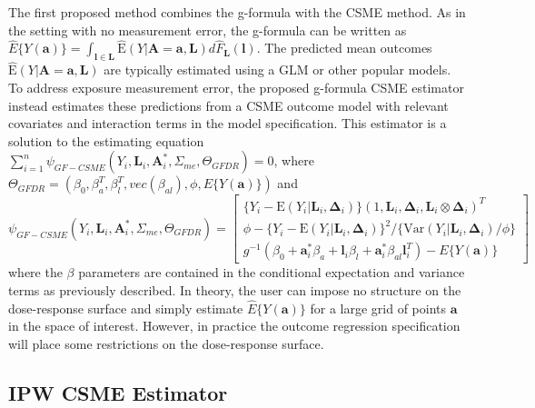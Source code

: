 \documentclass[useAMS,usenatbib,referee]{biom}
\begin{document}
\sloppy The first proposed method combines the g-formula with the CSME method. As in the setting with no measurement error, the g-formula can be written as $\hat{E}\{ Y(\bm{a}) \} = \int_{\bm{l} \in \bm{L}} \hat{\text{E}}(Y | \bm{A} = \bm{a}, \bm{L}) d\hat{F}_{\bm{L}}(\bm{l})$. The predicted mean outcomes $\hat{\text{E}}(Y | \bm{A} = \bm{a}, \bm{L})$ are typically estimated using a GLM or other popular models. To address exposure measurement error, the proposed g-formula CSME estimator instead estimates these predictions from a CSME outcome model with relevant covariates and interaction terms in the model specification. This estimator is a solution to the estimating equation $\sum_{i=1}^{n} \psi_{GF-CSME}(Y_{i}, \bm{L}_{i}, \bm{A}_{i}^{*}, \Sigma_{me}, \Theta_{GFDR}) = 0$, where $\Theta_{GFDR} = (\beta_{0}, \beta^{T}_{a}, \beta^{T}_{l}, vec(\beta_{al}), \phi, E \{ Y(\bm{a}) \})$ and
\begin{equation}
    \psi_{GF-CSME}(Y_{i}, \bm{L}_{i}, \bm{A}^{*}_{i}, \Sigma_{me}, \Theta_{GFDR}) =
    \begin{bmatrix}
       \{ Y_{i} - \text{E}(Y_{i} | \bm{L}_{i}, \bm{\Delta}_{i}) \} (1, \bm{L}_{i}, \bm{\Delta}_{i}, \bm{L}_{i} \otimes \bm{\Delta}_{i})^{T} \\
        \phi - \{ Y_{i} - \text{E}(Y_{i} | \bm{L}_{i}, \bm{\Delta}_{i}) \}^{2} / \{ \text{Var}(Y_{i} | \bm{L}_{i}, \bm{\Delta}_{i}) / \phi \} \\
        g^{-1}(\beta_{0} + \bm{a}^{*}_{i}\beta_{a} + \bm{l}_{i}\beta_{l} +
        \bm{a}^{*}_{i}\beta_{al}\bm{l}_{i}^{T}) - E \{ Y(\bm{a}) \}
    \end{bmatrix}
\end{equation}
where the $\beta$ parameters are contained in the conditional expectation and variance terms as previously described. In theory, the user can impose no structure on the dose-response surface and simply estimate $\hat{E}\{ Y(\bm{a}) \}$ for a large grid of points $\bm{a}$ in the space of interest. However, in practice the outcome regression specification will place some restrictions on the dose-response surface.

\subsection{IPW CSME Estimator}
\end{document}
